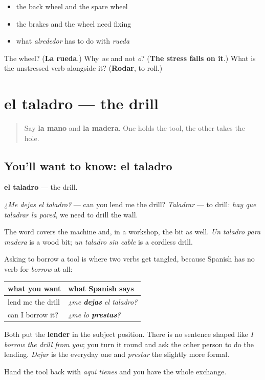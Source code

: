 \begin{itemize}
\raggedright
  \item the back wheel and the spare wheel
  \item the brakes and the wheel need fixing
  \item what \emph{alrededor} has to do with \emph{rueda}
\end{itemize}

\begin{tcolorbox}[breakable,colback=teal!4,colframe=teal!35!black,title={Before you move on}]
The wheel? (\textbf{La rueda}.) Why \emph{ue} and not \emph{o}? (\textbf{The stress falls on it}.) What is the unstressed verb alongside it? (\textbf{Rodar}, to roll.)
\end{tcolorbox}
\section[el taladro]{el taladro — the drill}

\label{lesson:ES-C449-taladro}



\begin{quote}
Say \textbf{la mano} and \textbf{la madera}. One holds the tool, the other takes the hole.
\end{quote}

\subsection*{You'll want to know: el taladro}
\textbf{el taladro} — the drill.

\emph{¿Me dejas el taladro?} — can you lend me the drill? \emph{Taladrar} — to drill: \emph{hay que taladrar la pared}, we need to drill the wall.

The word covers the machine and, in a workshop, the bit as well. \emph{Un taladro para madera} is a wood bit; \emph{un taladro sin cable} is a cordless drill.

\begin{grammarlens}[title={Grammar Lens: lending, in Spanish}]
Asking to borrow a tool is where two verbs get tangled, because Spanish has no verb for \emph{borrow} at all:

\noindent
\begin{tabularx}{\linewidth}{@{}>{\raggedright\arraybackslash}X>{\raggedright\arraybackslash}X@{}}
\toprule
\textbf{what you want} & \textbf{what Spanish says} \\
\midrule
lend me the drill & \emph{¿me \textbf{dejas} el taladro?} \\
can I borrow it? & \emph{¿me lo \textbf{prestas}?} \\
\bottomrule
\end{tabularx}

Both put the \textbf{lender} in the subject position. There is no sentence shaped like \emph{I borrow the drill from you}; you turn it round and ask the other person to do the lending. \emph{Dejar} is the everyday one and \emph{prestar} the slightly more formal.

Hand the tool back with \emph{aquí tienes} and you have the whole exchange.
\end{grammarlens}

